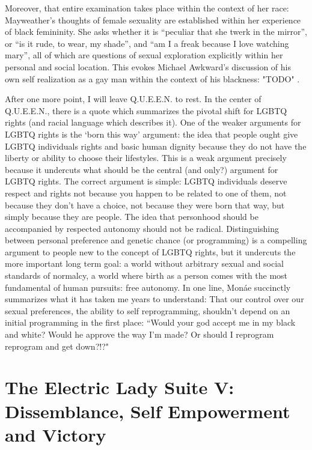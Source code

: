 \documentclass[a4paper, 11pt]{article} %
\begin{document}
Moreover, that entire examination takes place within the context of her race: Mayweather's thoughts of female sexuality are established within her experience of black femininity.
She asks whether it is ``peculiar that she twerk in the mirror'', or ``is it rude, to wear, my shade'', and ``am I a freak because I love watching mary'', all of which are questions of sexual exploration explicitly within her personal and social location.
This evokes Michael Awkward's discussion of his own self realization as a gay man within the context of his blackness: "TODO" \cite{awkward}.

After one more point, I will leave Q.U.E.E.N. to rest.
In the center of Q.U.E.E.N., there is a quote which summarizes the pivotal shift for LGBTQ rights (and racial language which describes it).
One of the weaker arguments for LGBTQ rights is the `born this way' argument: the idea that people ought give LGBTQ individuals rights and basic human dignity because they do not have the liberty or ability to choose their lifestyles.
This is a weak argument precisely because it undercuts what should be the central (and only?) argument for LGBTQ rights.
The correct argument is simple: LGBTQ individuals deserve respect and rights not because you happen to be related to one of them, not because they don't have a choice, not because they were born that way, but simply because they are people.
The idea that personhood should be accompanied by respected autonomy should not be radical.
Distinguishing between personal preference and genetic chance (or programming) is a compelling argument to people new to the concept of LGBTQ rights, but it undercuts the more important long term goal: a world without arbitrary sexual and social standards of normalcy, a world where birth as a person comes with the most fundamental of human pursuits: free autonomy. 
In one line, Mon\'ae succinctly summarizes what it has taken me years to understand: That our control over our sexual preferences, the ability to self reprogramming, shouldn't depend on an initial programming in the first place:
``Would your god accept me in my black and white? Would he approve the way I'm made? Or should I reprogram reprogram and get down?!?" \cite{queen}



\section*{The Electric Lady Suite V: Dissemblance, Self Empowerment and Victory}
\end{document}
